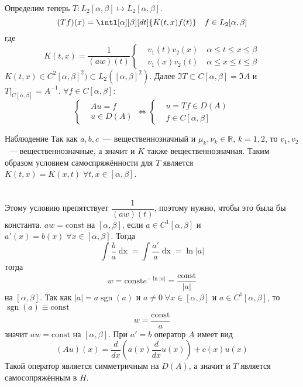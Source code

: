 \documentclass[14pt]{extarticle}
\begin{document}
Определим теперь $T : L_2[\alpha, \beta] \mapsto L_2[\alpha, \beta]$.
$$
(Tf)(x) = \intl[\alpha][\beta][dt]{K(t, x) f(t)} \quad f \in L_2[\alpha, \beta]
$$
где
$$
K(t, x) = \dfrac{1}{(aw)(t)}
\left\{
\begin{aligned}
    &v_1(t)v_2(x) \quad \alpha \le t \le x \le \beta\\
    &v_1(x)v_2(t) \quad \alpha \le x \le t \le \beta
\end{aligned}
\right.
$$
$K(t, x) \in C^2[\alpha, \beta]^2) \subset L_2([\alpha,\beta]^2)$.
Далее $\Im T \subset C[\alpha, \beta] = \Im A$ и $T|_{C[\alpha, \beta]} = A^{-1}$.
$\forall f \in C[\alpha, \beta]$:
$$
\left\{
\begin{aligned}
    &Au = f\\
    &u \in D(A)
\end{aligned}
\right. \Leftrightarrow
\left\{
\begin{aligned}
    &u = Tf \in D(A)\\
    &f \in C[\alpha, \beta]
\end{aligned}
\right.
$$
\begin{MathCl}{Наблюдение}
    Так как $a, b, c$~--- вещественнозначный и $\mu_k, \nu_k \in \mathbb R$, $k = 1, 2$, то
    $v_1, v_2$~--- вещественнозначные, а значит и $K$ также вещественнозначная.
    Таким образом условием самоспряжённости для $T$ является $K(t, x) = K(x, t)\;\forall t, x
    \in [\alpha, \beta]$.
\end{MathCl}
\\Этому условию препятствует $\dfrac{1}{(aw)(t)}$, поэтому нужно, чтобы это была бы
константа. $aw = \mathrm{const}$ на $[\alpha, \beta]$, если $a \in C^1[\alpha, \beta]$ и
$a'(x) = b(x)\;\forall x \in [\alpha, \beta]$.
Тогда
$$
\int\dfrac{b}{a} \mathop{dx} = \int \dfrac{a'}{a} \mathop{dx} = \ln |a| 
$$
тогда
$$
w = \mathrm{const} e^{-\ln |a|} = \dfrac{\mathrm{const}}{|a|}
$$
на $[\alpha, \beta]$.
Так как $|a| = a \mathop{\mathrm{sgn}}\nolimits(a)$ и $a \ne 0\;\forall x \in [\alpha, \beta]$
и $a \in C^1[\alpha, \beta]$, то $\mathop{\mathrm{sgn}}\nolimits(a) \equiv \mathrm{const}$
$$
w = \dfrac{\mathrm{const}}{a}
$$
значит $aw = \mathrm{const}$ на $[\alpha, \beta]$.
При $a' = b$ оператор $A$ имеет вид 
$$
(Au)(x) = \dfrac{d}{dx}(a(x)\dfrac{d}{dx}u(x)) + c(x) u(x)
$$
Такой оператор является симметричным на $D(A)$, а значит и $T$ является
самосопряжённым в $H$.
\end{document}
